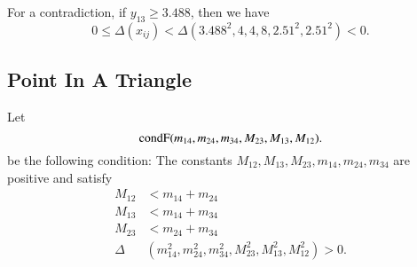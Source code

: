 \begin{tarskidata}
\begin{tarski}


\begin{proved}
For a contradiction, if $y_{13}\ge 3.488$, then
we have
    $$0\le \Delta(x_{ij}) < \Delta(3.488^2,4,4,8,2.51^2,2.51^2)<0.$$
\swallowed\end{proved}
\end{tarski}






%




\begin{tarski}
\section{Point In A Triangle}

\begin{definition}[$\op{condF}$]
Let
	$$
	{\operatorname{condF}}(m_{14},m_{24},m_{34},M_{23},M_{13},M_{12}).
	$$
be the following condition:
The constants $M_{12},M_{13},M_{23},m_{14},m_{24},m_{34}$ are positive and
satisfy 
	$$
	\begin{array}{rll}
		M_{12} &< m_{14} + m_{24}\\
		M_{13} &< m_{14} + m_{34}\\
		M_{23} &< m_{24} + m_{34}\\
		\Delta&(m_{14}^2,m_{24}^2,m_{34}^2,M_{23}^2,M_{13}^2,M_{12}^2) > 0.\\
	\end{array}
	$$
\end{definition}
\end{tarski}




\end{tarskidata}
